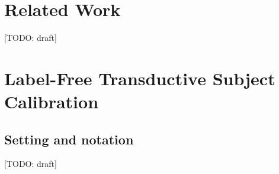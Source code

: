 \documentclass[10pt,twocolumn,letterpaper]{article}
\newcommand{\todo}[1]{{\color{red}[TODO: #1]}}
\begin{document}
\section{Related Work}
\label{sec:related}
\todo{draft}

\section{Label-Free Transductive Subject Calibration}
\label{sec:setting}

\subsection{Setting and notation}
\todo{draft}
\end{document}
